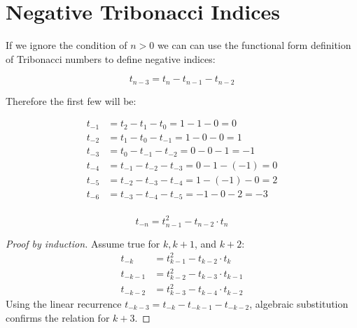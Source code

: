 \documentclass[a4paper]{article}
\begin{document}
\pagebreak

\section{Negative Tribonacci Indices}\label{trib:sec:negative}
If we ignore the condition of $n>0$ we can can use the functional form definition of Tribonacci numbers to define
negative indices:

\begin{equation}
t_{n-3} = t_n - t_{n-1} - t_{n-2}\label{trib:eq:equation3}
\end{equation}

Therefore the first few will be:

\begin{align*}
t_{-1} &= t_{2} - t_{1} - t_{0} = 1 - 1 - 0 = 0\\
t_{-2} &= t_{1} - t_{0} - t_{-1} = 1 - 0 - 0 = 1\\
t_{-3} &= t_{0} - t_{-1} - t_{-2} = 0 - 0 - 1 = -1\\
t_{-4} &= t_{-1} - t_{-2} - t_{-3} = 0 - 1 - (-1) = 0\\
t_{-5} &= t_{-2} - t_{-3} - t_{-4} = 1 - (-1) - 0 = 2\\
t_{-6} &= t_{-3} - t_{-4} - t_{-5} = -1 - 0 - 2 = -3\\
\end{align*}

\begin{theorem}
\[
t_{-n} = t_{n-1}^2 - t_{n-2} \cdot t_{n}
\]
\begin{proof}[Proof by induction]
Assume true for $k, k+1$, and $k+2$:
\begin{align*}
t_{-k} &= t_{k-1}^2 - t_{k-2} \cdot t_{k}\\
t_{-k-1} &= t_{k-2}^2 - t_{k-3} \cdot t_{k-1}\\
t_{-k-2} &= t_{k-3}^2 - t_{k-4} \cdot t_{k-2}
\end{align*}
Using the linear recurrence $t_{-k-3} = t_{-k} - t_{-k-1} - t_{-k-2}$, algebraic substitution confirms the relation for $k+3$.
\end{proof}
\end{theorem}
\end{document}
